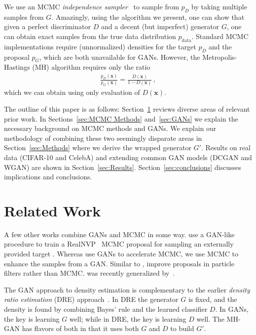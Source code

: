 \documentclass{article}
\renewcommand{\vec}[1]{{\boldsymbol{\mathbf{#1}}}} %
\newcommand{\target}{{p^\star}}
\newcommand{\PG}{{p_G}}
\newcommand{\PD}{{p_D}}
\newcommand{\PR}{{p_{\textrm{data}}}}
\begin{document}
We use an MCMC \emph{independence sampler}~\citep{Tierney1994} to sample from $\PD$ by taking multiple samples from $G$\@.
Amazingly, using the algorithm we present, one can show that given a perfect discriminator $D$ and a decent (but imperfect) generator $G$, one can obtain exact samples from the true data distribution $\PR$.
Standard MCMC implementations require (unnormalized) densities for the target $\PD$ and the proposal $\PG$, which are both unavailable for GANs.
However, the Metropolis-Hastings (MH) algorithm requires only the ratio
\begin{align}
  \frac{\PD(\vec x)}{\PG(\vec x)} = \frac{D(\vec x)}{1 - D(\vec x)}\,, \label{eq:PD inv}
\end{align}
which we can obtain using only evaluation of $D(\vec x)$.

The outline of this paper is as follows:
Section~\ref{sec:Related Work} reviews diverse areas of relevant prior work.
In Sections~\ref{sec:MCMC Methods} and~\ref{sec:GANs} we explain the necessary background on MCMC methods and GANs.
We explain our methodology of combining these two seemingly disparate areas in Section~\ref{sec:Methods} where we derive the wrapped generator $G'$.
Results on real data (CIFAR-10 and CelebA) and extending common GAN models (DCGAN and WGAN) are shown in Section~\ref{sec:Results}.
Section~\ref{sec:conclusions} discusses implications and conclusions.

\section{Related Work}
\label{sec:Related Work}

A few other works combine GANs and MCMC in some way.
\citet{Song2017} use a GAN-like procedure to train a RealNVP~\citep{Dinh2016} MCMC proposal for sampling an externally provided target \smash{$\target$}.
Whereas \citet{Song2017} use GANs to accelerate MCMC, we use MCMC to enhance the samples from a GAN\@.
Similar to \citet{Song2017}, \citet{Kempinska2017} improve proposals in particle filters rather than MCMC\@.
\citet{Song2017} was recently generalized by~\citet{Neklyudov2018}.

The GAN approach to density estimation is complementary to the earlier \emph{density ratio estimation} (DRE) approach~\citep{Sugiyama2012}\@.
In DRE the generator $G$ is fixed, and the density is found by combining Bayes' rule and the learned classifier $D$.
In GANs, the key is learning $G$ well; while in DRE, the key is learning $D$ well.
The MH-GAN has flavors of both in that it uses both $G$ and $D$ to build $G'$.
\end{document}
